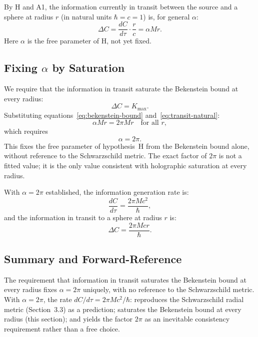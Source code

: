 \documentclass[12pt]{article}
\begin{document}
By H and A1, the information currently in transit between the source and
a sphere at radius $r$ (in natural units $\hbar = c = 1$) is, for
general $\alpha$:
\begin{equation}
  \Delta C = \frac{dC}{d\tau}\cdot\frac{r}{c} = \alpha Mr.
  \label{eq:transit-natural}
\end{equation}
Here $\alpha$ is the free parameter of H, not yet fixed.

\subsection{Fixing $\alpha$ by Saturation}

We require that the information in transit saturate the Bekenstein
bound at every radius:
\begin{equation}
  \Delta C = K_{\max}.
  \label{eq:saturation-condition}
\end{equation}
Substituting equations~\eqref{eq:bekenstein-bound}
and~\eqref{eq:transit-natural}:
\begin{equation}
  \alpha Mr = 2\pi Mr \quad \text{for all } r,
\end{equation}
which requires
\begin{equation}
  \alpha = 2\pi.
  \label{eq:alpha-fixed}
\end{equation}
This fixes the free parameter of hypothesis~H from the Bekenstein
bound alone, without reference to the Schwarzschild metric.
The exact factor of $2\pi$ is not a fitted value; it is the only
value consistent with holographic saturation at every radius.

With $\alpha = 2\pi$ established, the information generation rate is:
\begin{equation}
  \frac{dC}{d\tau} = \frac{2\pi Mc^2}{\hbar},
  \label{eq:rate-fixed}
\end{equation}
and the information in transit to a sphere at radius $r$ is:
\begin{equation}
  \Delta C = \frac{2\pi Mcr}{\hbar}.
  \label{eq:transit-fixed}
\end{equation}

\subsection{Summary and Forward-Reference}

The requirement that information in transit saturates the Bekenstein
bound at every radius fixes $\alpha = 2\pi$ uniquely, with no reference
to the Schwarzschild metric.
With $\alpha = 2\pi$, the rate $dC/d\tau = 2\pi Mc^2/\hbar$:
reproduces the Schwarzschild radial metric (Section~3.3) as a
prediction; saturates the Bekenstein bound at every radius (this
section); and yields the factor $2\pi$ as an inevitable consistency
requirement rather than a free choice.
\end{document}
